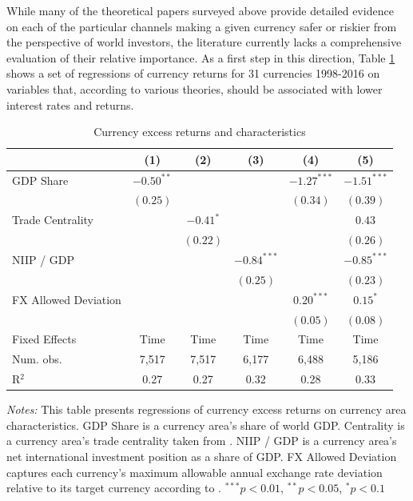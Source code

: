 \documentclass{ar-1col}
\begin{document}
While many of the theoretical papers surveyed above provide detailed evidence on each of the particular channels making a given currency safer or riskier from the perspective of world investors, the literature currently lacks a comprehensive evaluation of their relative importance. As a first step in this direction, Table \ref{table:rx_char} shows a set of regressions of currency returns for 31 currencies 1998-2016 on variables that, according to various theories, should be associated with lower interest rates and returns. 
\begin{table}[htp]
\begin{center}
\caption{Currency excess returns and characteristics}
\label{table:rx_char}
\vspace{1em}
\begin{tabular}{l c c c c c }
\hline
\hline
 & (1) & (2) & (3) & (4) & (5) \\
\hline
GDP Share               & $-0.50^{**}$ &             &               & $-1.27^{***}$ & $-1.51^{***}$ \\
                        & $(0.25)$     &             &               & $(0.34)$      & $(0.39)$      \\
Trade Centrality              &              & $-0.41^{*}$ &               &               & $0.43$        \\
                        &              & $(0.22)$    &               &               & $(0.26)$      \\
NIIP / GDP              &              &             & $-0.84^{***}$ &               & $-0.85^{***}$ \\
                        &              &             & $(0.25)$      &               & $(0.23)$      \\
FX Allowed Deviation         &              &             &               & $0.20^{***}$  & $0.15^{*}$    \\
                        &              &             &               & $(0.05)$      & $(0.08)$      \\
\hline
Fixed Effects & Time & Time & Time & Time & Time \\
Num. obs.     & 7,517        & 7,517     & 6,177          & 6,488          & 5,186          \\
R$^2$         & 0.27        & 0.27     & 0.32          & 0.28          & 0.33          \\
\hline
\hline
\end{tabular}
\end{center}
\begin{minipage}[htp!]{\textwidth}
\scriptsize
\emph{Notes:} This table presents regressions of currency excess returns on currency area characteristics. GDP Share is a currency area's share of world GDP. Centrality is a currency area's trade centrality taken from \citet{Richmond2019}. NIIP / GDP is a currency area's net international investment position as a share of GDP. FX Allowed Deviation captures each currency's maximum allowable annual exchange rate deviation relative to its target currency according to \citet{ilzetzki2018exchange}. $^{***}p<0.01$, $^{**}p<0.05$, $^*p<0.1$
\end{minipage}
\end{table}
\end{document}

